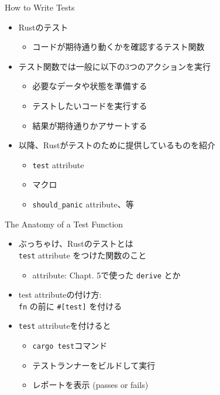 \documentclass[cjk,14pt,xcolor=dvipsnames,table,dvipdfmx,professional font,t,fragile]{beamer}
\begin{document}
\begin{frame}{How to Write Tests}
 \begin{itemize}
  \item Rustのテスト
	\begin{itemize}
	 \item コードが期待通り動くかを確認するテスト関数
	\end{itemize}
  \item テスト関数では一般に以下の3つのアクションを実行
	\begin{itemize}
	 \item 必要なデータや状態を準備する
	 \item テストしたいコードを実行する
	 \item 結果が期待通りかアサートする
	\end{itemize}
  \item 以降、Rustがテストのために提供しているものを紹介
	\begin{itemize}
	 \item \texttt{test} attribute
	 \item マクロ
	 \item \texttt{should\_panic} attribute、等
	\end{itemize}
 \end{itemize}
\end{frame}

\begin{frame}[containsverbatim]{The Anatomy of a Test Function}
 \begin{itemize}
  \item ぶっちゃけ、Rustのテストとは\\
	\texttt{test} attribute をつけた関数のこと
	\begin{itemize}
	 \item attribute: Chapt. 5で使った \texttt{derive} とか
	\end{itemize}
  \item test attributeの付け方: \\
	\hspace{2zw} \texttt{fn} の前に \verb|#[test]| を付ける
  \item \texttt{test} attributeを付けると
	\begin{itemize}
	 \item \texttt{cargo test}コマンド
	 \item テストランナーをビルドして実行
	 \item レポートを表示 (passes or fails)
	\end{itemize}
 \end{itemize}
\end{frame}
\end{document}
